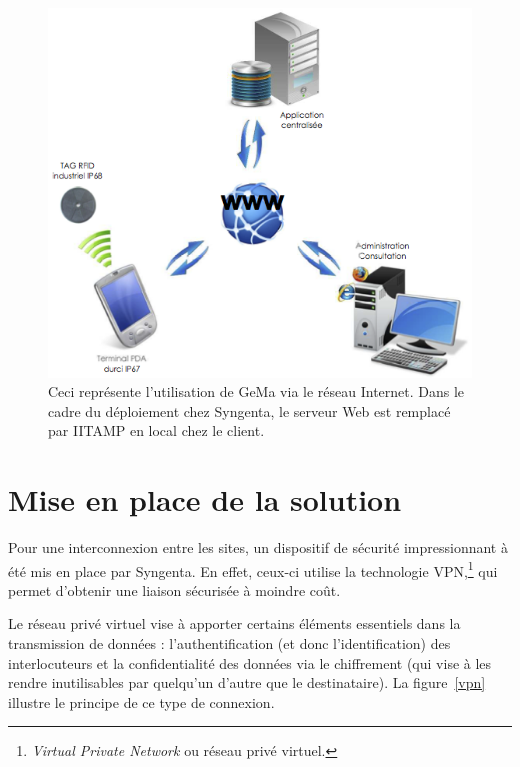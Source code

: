 \begin{figure}
  \begin{center}
    \includegraphics[scale=1.5]{images/gema.png}
    \caption{Ceci représente l'utilisation de GeMa via le réseau
    Internet. Dans le cadre du déploiement chez Syngenta, le serveur Web
    est remplacé par IITAMP en local chez le client.}
    \label{gema}
  \end{center}
\end{figure}

\section{Mise en place de la solution} %
\label{sec:Mise en place de la solution}

Pour une interconnexion entre les sites, un dispositif de sécurité
impressionnant à été mis en place par Syngenta. En effet, ceux-ci
utilise la technologie VPN,\footnote{\emph{Virtual Private Network} ou
réseau privé virtuel.} qui permet d'obtenir une liaison sécurisée à
moindre coût.

Le réseau privé virtuel vise à apporter certains éléments essentiels
dans la transmission de données : l'authentification (et donc
l'identification) des interlocuteurs et la confidentialité des données via
le chiffrement (qui vise à les rendre inutilisables par quelqu'un
d'autre que le destinataire). La figure~\ref{vpn} illustre le principe
de ce type de connexion.


